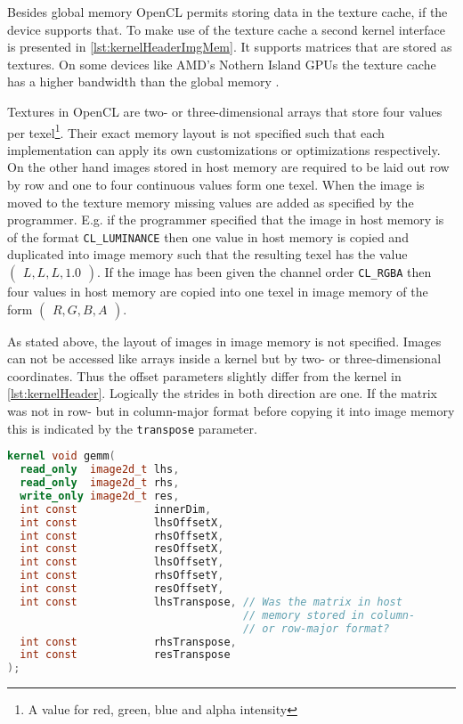 Besides global memory OpenCL permits storing data in the texture cache, if the 
device supports that. To make use of the texture cache a second kernel 
interface is presented in \cref{lst:kernelHeaderImgMem}. It supports matrices 
that are stored as textures. On some devices like AMD's Nothern Island 
\acp{GPU} the texture cache has a higher bandwidth than the global memory 
\cite[Section 7.4]{AMD2013}. 

Textures in OpenCL are two- or three-dimensional arrays that store four values 
per texel\footnote{A value for red, green, blue and alpha intensity}. Their 
exact memory layout is not specified such that each implementation can apply 
its own customizations or optimizations respectively. On the other hand images 
stored in host memory are required to be laid out row by row and one to four 
continuous values form one texel. When the image is moved to the texture memory 
missing values are added as specified by the programmer. E.g. if the programmer 
specified that the image in host memory is of the format \texttt{CL\_LUMINANCE} 
then one value in host memory is copied and duplicated into image memory such 
that the resulting texel has the value $\begin{pmatrix}L,L,L,1.0\end{pmatrix}$. 
If the image has been given the channel order \texttt{CL\_RGBA} then four 
values in host memory are copied into one texel in image memory of the form 
$\begin{pmatrix}R,G,B,A\end{pmatrix}$.

As stated above, the layout of images in image memory is not specified. Images 
can not be accessed like arrays inside a kernel but by two- or 
three-dimensional coordinates. Thus the offset parameters slightly differ from 
the kernel in \cref{lst:kernelHeader}. Logically the strides in both direction 
are one. If the matrix was not in row- but in column-major format before 
copying it into image memory this is indicated by the \texttt{transpose} 
parameter.


\begin{lstlisting}[caption={Interface of the OpenCL kernel for matrix-matrix 
multiplication using image 
memory},label={lst:kernelHeaderImgMem},language=OpenCL]
kernel void gemm(
  read_only  image2d_t lhs,
  read_only  image2d_t rhs,
  write_only image2d_t res,
  int const            innerDim,
  int const            lhsOffsetX,
  int const            rhsOffsetX,
  int const            resOffsetX,
  int const            lhsOffsetY,
  int const            rhsOffsetY,
  int const            resOffsetY,
  int const            lhsTranspose, // Was the matrix in host
                                     // memory stored in column-
                                     // or row-major format?
  int const            rhsTranspose,
  int const            resTranspose
);\end{lstlisting}


